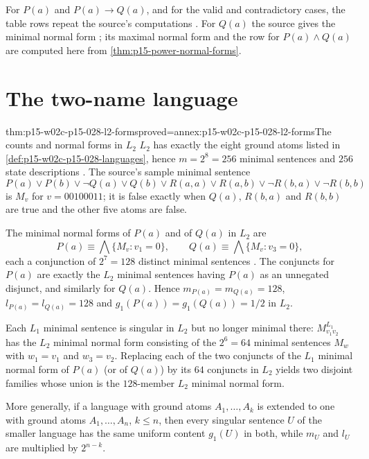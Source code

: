 For \(P(a)\) and \(P(a)\to Q(a)\), and for the valid and contradictory
cases, the table rows repeat the source's computations
\cite[p.~168]{HempelOppenheim1948Explanation}. For \(Q(a)\) the source
gives the minimal normal form \cite[p.~166]{HempelOppenheim1948Explanation};
its maximal normal form and the row for \(P(a)\land Q(a)\) are
computed here from \cref{thm:p15-power-normal-forms}.

\section{The two-name language}
\label{sec:p15-w02c-p15-028-l2}

\begin{hbtheorem}{thm:p15-w02c-p15-028-l2-forms}{proved=annex:p15-w02c-p15-028-l2-forms}{The counts and normal forms in \(L_2\)}
\(L_2\) has exactly the eight ground atoms listed in
\cref{def:p15-w02c-p15-028-languages}, hence \(m=2^8=256\) minimal
sentences and \(256\) state descriptions
\cite[p.~166]{HempelOppenheim1948Explanation}. The source's sample
minimal sentence
\[
 P(a)\lor P(b)\lor\neg Q(a)\lor Q(b)\lor R(a,a)\lor R(a,b)
       \lor\neg R(b,a)\lor\neg R(b,b)
\]
is \(M_v\) for \(v=00100011\); it is false exactly when \(Q(a)\),
\(R(b,a)\) and \(R(b,b)\) are true and the other five atoms are false.

The minimal normal forms of \(P(a)\) and of \(Q(a)\) in \(L_2\) are
\[
 P(a)\equiv\bigwedge\{M_v: v_1=0\},\qquad
 Q(a)\equiv\bigwedge\{M_v: v_3=0\},
\]
each a conjunction of \(2^7=128\) distinct minimal sentences
\cite[p.~166]{HempelOppenheim1948Explanation}. The conjuncts for
\(P(a)\) are exactly the \(L_2\) minimal sentences having \(P(a)\) as
an unnegated disjunct, and similarly for \(Q(a)\). Hence
\(m_{P(a)}=m_{Q(a)}=128\), \(l_{P(a)}=l_{Q(a)}=128\) and
\(g_1(P(a))=g_1(Q(a))=1/2\) in \(L_2\).

Each \(L_1\) minimal sentence is singular in \(L_2\) but no longer
minimal there: \(M^{L_1}_{v_1v_2}\) has the \(L_2\) minimal normal form
consisting of the \(2^6=64\) minimal sentences \(M_w\) with
\(w_1=v_1\) and \(w_3=v_2\). Replacing each of the two conjuncts of the
\(L_1\) minimal normal form of \(P(a)\) (or of \(Q(a)\)) by its \(64\)
conjuncts in \(L_2\) yields two disjoint families whose union is the
\(128\)-member \(L_2\) minimal normal form.

More generally, if a language with ground atoms \(A_1,\ldots,A_k\) is
extended to one with ground atoms \(A_1,\ldots,A_n\), \(k\le n\), then
every singular sentence \(U\) of the smaller language has the same
uniform content \(g_1(U)\) in both, while \(m_U\) and \(l_U\) are
multiplied by \(2^{n-k}\).
\end{hbtheorem}

